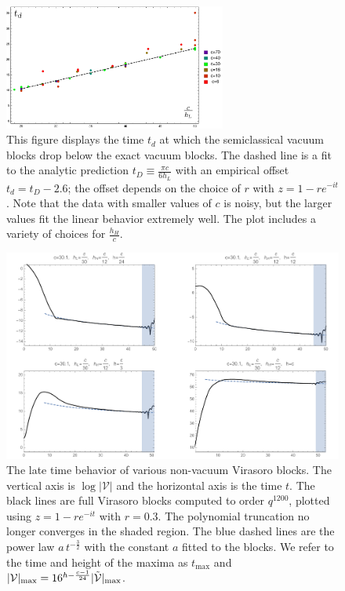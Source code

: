 \begin{figure}[h]
\begin{centering}
\includegraphics[width=0.65\textwidth]{virasoro_chapter/depTimePlot}
\caption{This figure displays the time $t_d$ at which the semiclassical vacuum blocks drop below the exact vacuum blocks.  The dashed line is a fit to the analytic prediction $t_D \equiv \frac{\pi c}{6 h_L}$ with an empirical offset $t_d = t_D -  2.6$; the offset depends on the choice of $r$ with $z = 1 - r e^{-it}$. Note that the data with smaller values of $c$ is noisy, but the larger values fit the linear behavior extremely well.  The plot includes a variety of choices for $\frac{h_H}{c}$. 
\label{fig:td}}
\par\end{centering}
\end{figure}

\begin{figure}[h]
\centering{}\includegraphics[scale=0.5]{virasoro_chapter/NonVBlock}
\caption{The late time behavior of various non-vacuum Virasoro blocks. The vertical axis is $\log|\mathcal{V}|$ and the horizontal axis is the time $t$. The black lines are full Virasoro blocks computed to order $q^{1200}$, plotted using $z = 1 - r e^{-it}$ with $r=0.3$. The polynomial truncation no longer converges  in the shaded region. The blue dashed lines are the power law $a \, t^{-\frac{3}{2}}$ with the constant $a$ fitted to the blocks. We refer to the time and height  of the maxima as $t_{\max}$ and $|{\cal V}|_{\max} = 16^{h - \frac{c-1}{24}} |\tilde {{\cal V}}|_{\max}$.
\label{NonVBlock}}
\end{figure}



